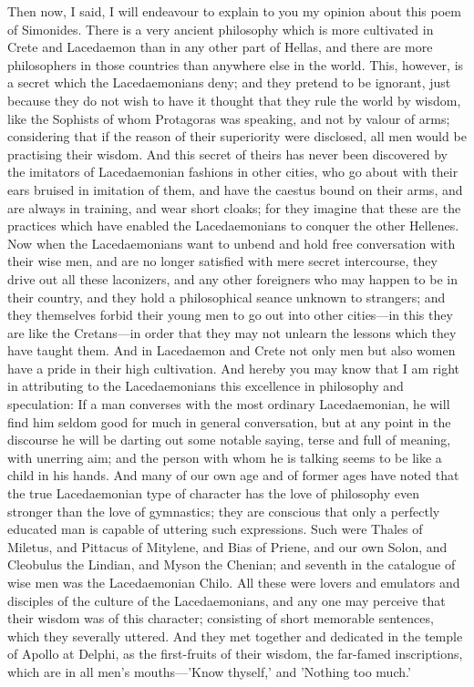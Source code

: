 \documentclass[11pt,letter]{article}
\begin{document}
\par  Then now, I said, I will endeavour to explain to you my opinion about this poem of Simonides. There is a very ancient philosophy which is more cultivated in Crete and Lacedaemon than in any other part of Hellas, and there are more philosophers in those countries than anywhere else in the world. This, however, is a secret which the Lacedaemonians deny; and they pretend to be ignorant, just because they do not wish to have it thought that they rule the world by wisdom, like the Sophists of whom Protagoras was speaking, and not by valour of arms; considering that if the reason of their superiority were disclosed, all men would be practising their wisdom. And this secret of theirs has never been discovered by the imitators of Lacedaemonian fashions in other cities, who go about with their ears bruised in imitation of them, and have the caestus bound on their arms, and are always in training, and wear short cloaks; for they imagine that these are the practices which have enabled the Lacedaemonians to conquer the other Hellenes. Now when the Lacedaemonians want to unbend and hold free conversation with their wise men, and are no longer satisfied with mere secret intercourse, they drive out all these laconizers, and any other foreigners who may happen to be in their country, and they hold a philosophical seance unknown to strangers; and they themselves forbid their young men to go out into other cities—in this they are like the Cretans—in order that they may not unlearn the lessons which they have taught them. And in Lacedaemon and Crete not only men but also women have a pride in their high cultivation. And hereby you may know that I am right in attributing to the Lacedaemonians this excellence in philosophy and speculation: If a man converses with the most ordinary Lacedaemonian, he will find him seldom good for much in general conversation, but at any point in the discourse he will be darting out some notable saying, terse and full of meaning, with unerring aim; and the person with whom he is talking seems to be like a child in his hands. And many of our own age and of former ages have noted that the true Lacedaemonian type of character has the love of philosophy even stronger than the love of gymnastics; they are conscious that only a perfectly educated man is capable of uttering such expressions. Such were Thales of Miletus, and Pittacus of Mitylene, and Bias of Priene, and our own Solon, and Cleobulus the Lindian, and Myson the Chenian; and seventh in the catalogue of wise men was the Lacedaemonian Chilo. All these were lovers and emulators and disciples of the culture of the Lacedaemonians, and any one may perceive that their wisdom was of this character; consisting of short memorable sentences, which they severally uttered. And they met together and dedicated in the temple of Apollo at Delphi, as the first-fruits of their wisdom, the far-famed inscriptions, which are in all men's mouths—'Know thyself,' and 'Nothing too much.'
\end{document}
